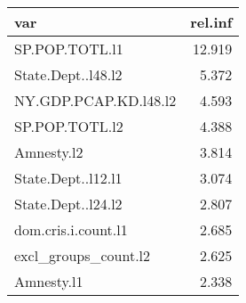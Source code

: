 \begin{tabular}{lr}
  \hline
var & rel.inf \\ 
  \hline
SP.POP.TOTL.l1 & 12.919 \\ 
  State.Dept..l48.l2 & 5.372 \\ 
  NY.GDP.PCAP.KD.l48.l2 & 4.593 \\ 
  SP.POP.TOTL.l2 & 4.388 \\ 
  Amnesty.l2 & 3.814 \\ 
  State.Dept..l12.l1 & 3.074 \\ 
  State.Dept..l24.l2 & 2.807 \\ 
  dom.cris.i.count.l1 & 2.685 \\ 
  excl\_groups\_count.l2 & 2.625 \\ 
  Amnesty.l1 & 2.338 \\ 
   \hline
\end{tabular}
